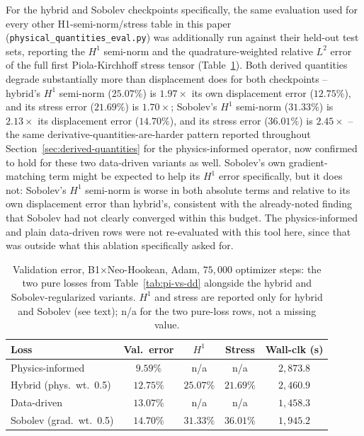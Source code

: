 \documentclass[final,5p,times]{elsarticle}
\begin{document}
For the hybrid and Sobolev checkpoints specifically, the same
evaluation used for every other H1-semi-norm/stress table in this paper
(\texttt{physical\_quantities\_eval.py}) was additionally run against
their held-out test sets, reporting the $H^1$ semi-norm and the
quadrature-weighted relative $L^2$ error of the full first
Piola-Kirchhoff stress tensor (Table~\ref{tab:hybrid-sobolev}).
Both derived quantities degrade substantially more than displacement
does for both checkpoints -- hybrid's $H^1$ semi-norm ($25.07\%$) is
$1.97\times$ its own displacement error ($12.75\%$), and its stress
error ($21.69\%$) is $1.70\times$; Sobolev's $H^1$ semi-norm
($31.33\%$) is $2.13\times$ its displacement error ($14.70\%$), and its
stress error ($36.01\%$) is $2.45\times$ -- the same
derivative-quantities-are-harder pattern reported throughout
Section~\ref{sec:derived-quantities} for the physics-informed operator,
now confirmed to hold for these two data-driven variants as well.
Sobolev's own gradient-matching term might be expected to help its $H^1$
error specifically, but it does not: Sobolev's $H^1$ semi-norm is worse
in both absolute terms and relative to its own displacement error than
hybrid's, consistent with the already-noted finding that Sobolev had not
clearly converged within this budget. The physics-informed and plain
data-driven rows were not re-evaluated with this tool here, since that
was outside what this ablation specifically asked for.

\begin{table}[h]
\centering
\caption{Validation error, B1$\times$Neo-Hookean, Adam, $75{,}000$
  optimizer steps: the two pure losses from Table~\ref{tab:pi-vs-dd}
  alongside the hybrid and Sobolev-regularized variants. $H^1$ and
  stress are reported only for hybrid and Sobolev (see text); n/a for
  the two pure-loss rows, not a missing value.}
\label{tab:hybrid-sobolev}
\footnotesize
\setlength{\tabcolsep}{3pt}
\begin{tabular}{lcccc}
\toprule
Loss & Val.\ error & $H^1$ & Stress & Wall-clk (s) \\
\midrule
Physics-informed          & $9.59\%$  & n/a & n/a & $2{,}873.8$ \\
Hybrid (phys.\ wt.\ 0.5)   & $12.75\%$ & $25.07\%$ & $21.69\%$ & $2{,}460.9$ \\
Data-driven                & $13.07\%$ & n/a & n/a & $1{,}458.3$ \\
Sobolev (grad.\ wt.\ 0.5)  & $14.70\%$ & $31.33\%$ & $36.01\%$ & $1{,}945.2$ \\
\bottomrule
\end{tabular}
\end{table}
\end{document}
